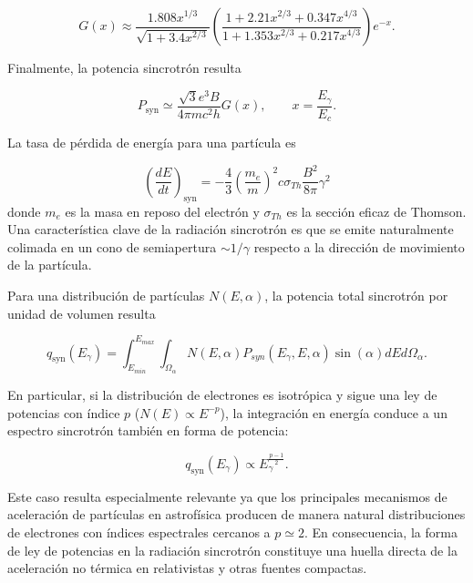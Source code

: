 \begin{equation}\label{eq:mod-30}
    G(x) \approx \frac{1.808x^{1/3}}{\sqrt{1 + 3.4x^{2/3}}}\left(\frac{1 + 2.21x^{2/3}+0.347x^{4/3}}{1 +  1.353x^{2/3}+ 0.217x^{4/3}}\right)e^{-x }.
\end{equation}

Finalmente, la potencia sincrotrón resulta

\begin{equation}\label{eq:mod-31}
    P_{\text{syn}}\simeq\frac{\sqrt{3}e^3B}{4\pi mc^2h}G(x), 
    \qquad x=\frac{E_\gamma}{E_c}.
\end{equation}


La tasa de pérdida de energía para una partícula es

\begin{equation}\label{eq:marco-4}
    \left(\frac{dE}{dt}\right)_{\text{syn}}=-\frac{4}{3}\left(\frac{m_{e}}{m}\right)^2c\sigma_{Th}\frac{B^2}{8\pi}\gamma^2
\end{equation}
donde $m_e$ es la masa en reposo del electrón y $\sigma_{Th}$ es la sección eficaz de Thomson. Una característica clave de la radiación sincrotrón es que se emite naturalmente colimada en un cono de semiapertura $\sim1/\gamma$ respecto a la dirección de movimiento de la partícula.

Para una distribución de partículas $N(E,\alpha)$, la potencia total sincrotrón por unidad de volumen resulta

\begin{equation}\label{eq:marco-5}
    q_{\text{syn}}(E_\gamma)=\int_{E_{min}}^{E_{max}}\int_{\Omega_{\alpha}} N(E,\alpha)P_{syn}(E_\gamma,E,\alpha)\sin(\alpha)dEd\Omega_{\alpha}.
\end{equation}


En particular, si la distribución de electrones es isotrópica y sigue una ley de potencias con índice $p$ ($N(E)\propto E^{-p}$), la integración en energía conduce a un espectro sincrotrón también en forma de potencia:

\begin{equation}\label{eq:marco-6}
    q_{\text{syn}}(E_\gamma)\propto E_\gamma^{\frac{p-1}{2}}.
\end{equation}

Este caso resulta especialmente relevante ya que los principales mecanismos de aceleración de partículas en astrofísica producen de manera natural distribuciones de electrones con índices espectrales cercanos a $p\simeq 2$. En consecuencia, la forma de ley de potencias en la radiación sincrotrón constituye una huella directa de la aceleración no térmica en \jets relativistas y otras fuentes compactas.

